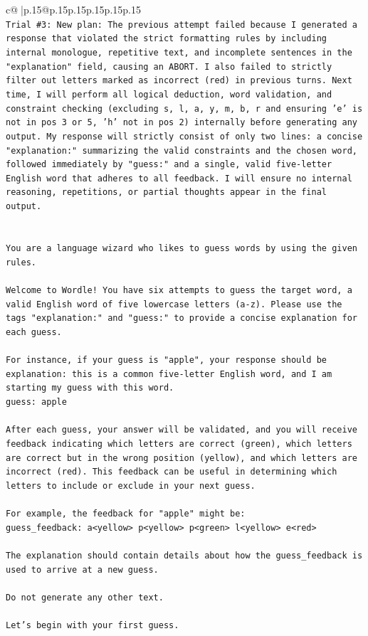 \documentclass{article}
\begin{document}
{\begin{supertabular}{c@{$\;$}|p{.15\linewidth}@{}p{.15\linewidth}p{.15\linewidth}p{.15\linewidth}p{.15\linewidth}p{.15\linewidth}}
{{{\\ 
\texttt{Trial \#3: New plan: The previous attempt failed because I generated a response that violated the strict formatting rules by including internal monologue, repetitive text, and incomplete sentences in the "explanation" field, causing an ABORT. I also failed to strictly filter out letters marked as incorrect (red) in previous turns. Next time, I will perform all logical deduction, word validation, and constraint checking (excluding s, l, a, y, m, b, r and ensuring 'e' is not in pos 3 or 5, 'h' not in pos 2) internally before generating any output. My response will strictly consist of only two lines: a concise "explanation:" summarizing the valid constraints and the chosen word, followed immediately by "guess:" and a single, valid five{-}letter English word that adheres to all feedback. I will ensure no internal reasoning, repetitions, or partial thoughts appear in the final output.} \\
\\ 
\\ 
\texttt{You are a language wizard who likes to guess words by using the given rules.} \\
\\ 
\texttt{Welcome to Wordle! You have six attempts to guess the target word, a valid English word of five lowercase letters (a{-}z). Please use the tags "explanation:" and "guess:" to provide a concise explanation for each guess.} \\
\\ 
\texttt{For instance, if your guess is "apple", your response should be} \\
\texttt{explanation: this is a common five{-}letter English word, and I am starting my guess with this word.} \\
\texttt{guess: apple} \\
\\ 
\texttt{After each guess, your answer will be validated, and you will receive feedback indicating which letters are correct (green), which letters are correct but in the wrong position (yellow), and which letters are incorrect (red). This feedback can be useful in determining which letters to include or exclude in your next guess.} \\
\\ 
\texttt{For example, the feedback for "apple" might be:} \\
\texttt{guess\_feedback: a<yellow> p<yellow> p<green> l<yellow> e<red>} \\
\\ 
\texttt{The explanation should contain details about how the guess\_feedback is used to arrive at a new guess.} \\
\\ 
\texttt{Do not generate any other text.} \\
\\ 
\texttt{Let's begin with your first guess.} \\
            }
        }
    }
     \\ \\


\end{supertabular}}
\end{document}
